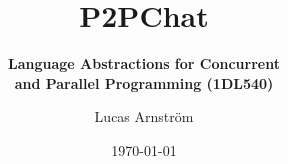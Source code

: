 \documentclass{beamer}
\title{P2PChat}
\subtitle{\textbf{Language Abstractions for Concurrent\\and Parallel Programming (1DL540)}}
\author{Lucas Arnström}
\institute[Dept. of Information Technology] %
{
  Department of Computer Systems\\
  Uppsala University
}
\date %
{\today}
\begin{document}
  \begin{frame}[plain] %
    \titlepage
  \end{frame}

  
\end{document}
